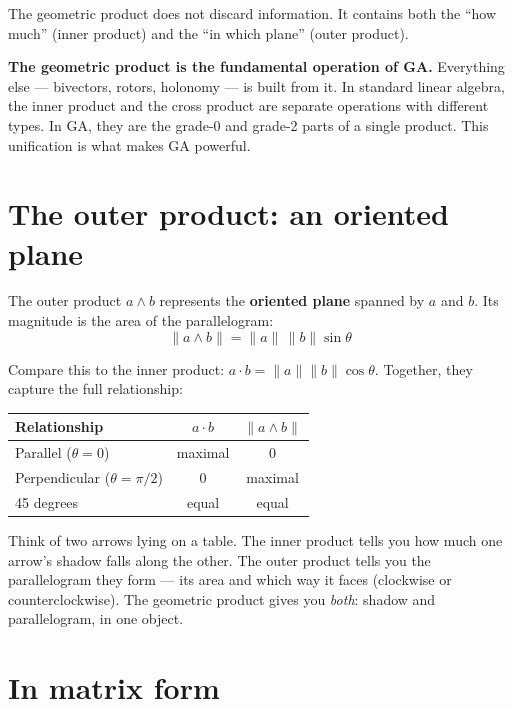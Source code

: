 \documentclass[11pt, twoside, openright]{memoir}
\newcommand{\ip}{\cdot}           %
\newcommand{\op}{\wedge}          %
\begin{document}
The geometric product does not discard information.  It contains both the
``how much'' (inner product) and the ``in which plane'' (outer product).

\begin{gabox}
\textbf{The geometric product is the fundamental operation of GA.}
Everything else --- bivectors, rotors, holonomy --- is built from it.
In standard linear algebra, the inner product and the cross product are
separate operations with different types.  In GA, they are the grade-0
and grade-2 parts of a single product.  This unification is what makes
GA powerful.
\end{gabox}

\section{The outer product: an oriented plane}

The outer product $a \op b$ represents the \textbf{oriented plane}
spanned by $a$ and $b$.  Its magnitude is the area of the parallelogram:
\[
  \|a \op b\| = \|a\| \, \|b\| \sin\theta
\]

Compare this to the inner product: $a \ip b = \|a\|\|b\|\cos\theta$.
Together, they capture the full relationship:

\begin{center}
\renewcommand{\arraystretch}{1.4}\small
\begin{tabular}{@{}lcc@{}}
\toprule
\textbf{Relationship} & $a \ip b$ & $\|a \op b\|$ \\
\midrule
Parallel ($\theta = 0$) & maximal & 0 \\
Perpendicular ($\theta = \pi/2$) & 0 & maximal \\
45 degrees & equal & equal \\
\bottomrule
\end{tabular}
\end{center}

\begin{analogy}
Think of two arrows lying on a table.  The inner product tells you
how much one arrow's shadow falls along the other.  The outer product
tells you the parallelogram they form --- its area and which way it
faces (clockwise or counterclockwise).  The geometric product gives
you \emph{both}: shadow and parallelogram, in one object.
\end{analogy}

\section{In matrix form}
\end{document}
